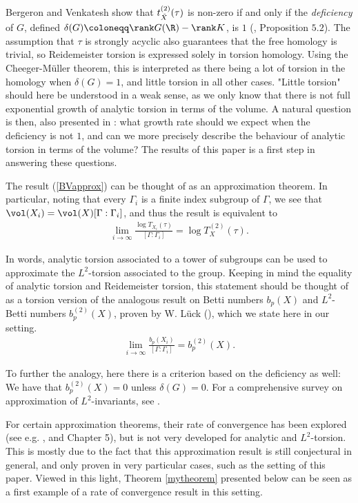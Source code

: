 \noindent Bergeron and Venkatesh show that $t^{(2)}_{\Tilde{X}}(\tau)$ is non-zero if and only if the \textit{deficiency} of $G$, defined $\delta(G)\coloneqq\rank G(\R)-\rank K$, is $1$ (\cite{BV}, Proposition $5.2$). The assumption that $\tau$ is strongly acyclic also guarantees that the free homology is trivial, so Reidemeister torsion is expressed solely in torsion homology. Using the Cheeger-Müller theorem, this is interpreted as there being a lot of torsion in the homology when $\delta(G)=1$, and little torsion in all other cases. "Little torsion" should here be understood in a weak sense, as we only know that there is not full exponential growth of analytic torsion in terms of the volume. A natural question is then, also presented in \cite{AGMY}: what growth rate should we expect when the deficiency is not $1$, and can we more precisely describe the behaviour of analytic torsion in terms of the volume? The results of this paper is a first step in answering these questions.

The result (\ref{BVapprox}) can be thought of as an approximation theorem. In particular, noting that every $\Gamma_i$ is a finite index subgroup of $\Gamma$, we see that $\vol(X_i)=\vol(X)[\Gamma:\Gamma_i]$, and thus the result is equivalent to 
\begin{align}
    \lim_{i\to\infty} \frac{\log T_{X_i}(\tau)}{[\Gamma:\Gamma_i]} = \log T^{(2)}_{X}(\tau).
\end{align}

\noindent In words, analytic torsion associated to a tower of subgroups can be used to approximate the $L^2$-torsion associated to the group. Keeping in mind the equality of analytic torsion and Reidemeister torsion, this statement should be thought of as a torsion version of the analogous result on Betti numbers $b_p(X)$ and $L^2$-Betti numbers $b_p^{(2)}(X)$, proven by W. Lück (\cite{Lück1}), which we state here in our setting.
\begin{align}
    \lim_{i\to\infty} \frac{b_p(X_i)}{[\Gamma:\Gamma_i]} = b_p^{(2)}(X).
\end{align}

\noindent To further the analogy, here there is a criterion based on the deficiency as well: We have that $b_p^{(2)}(X)=0$ unless $\delta(G) = 0$. For a comprehensive survey on approximation of $L^2$-invariants, see \cite{Lück2}.

For certain approximation theorems, their rate of convergence has been explored (see e.g. \cite{BLLS}, and \cite{Lück2} Chapter 5), but is not very developed for analytic and $L^2$-torsion. This is mostly due to the fact that this approximation result is still conjectural in general, and only proven in very particular cases, such as the setting of this paper. Viewed in this light, Theorem \ref{mytheorem} presented below can be seen as a first example of a rate of convergence result in this setting.

